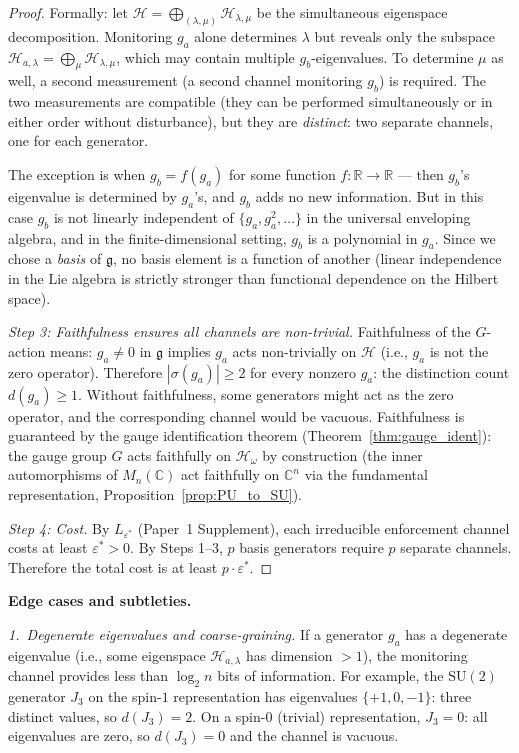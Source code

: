 \documentclass[11pt,a4paper]{article}
\theoremstyle{definition}
\newcommand{\SU}{\mathrm{SU}}
\begin{document}
\begin{proof}
Formally: let $\mathcal{H} = \bigoplus_{(\lambda, \mu)}
\mathcal{H}_{\lambda,\mu}$ be the simultaneous eigenspace
decomposition.  Monitoring $g_a$ alone determines $\lambda$ but
reveals only the subspace $\mathcal{H}_{a,\lambda} =
\bigoplus_\mu \mathcal{H}_{\lambda,\mu}$, which may contain multiple
$g_b$-eigenvalues.  To determine $\mu$ as well, a second measurement
(a second channel monitoring $g_b$) is required.  The two measurements
are compatible (they can be performed simultaneously or in either
order without disturbance), but they are \emph{distinct}: two
separate channels, one for each generator.

The exception is when $g_b = f(g_a)$ for some function
$f: \mathbb{R} \to \mathbb{R}$ --- then $g_b$'s eigenvalue is
determined by $g_a$'s, and $g_b$ adds no new information.  But in
this case $g_b$ is not linearly independent of
$\{g_a, g_a^2, \ldots\}$ in the universal enveloping algebra, and in
the finite-dimensional setting, $g_b$ is a polynomial in $g_a$.
Since we chose a \emph{basis} of $\mathfrak{g}$, no basis element is
a function of another (linear independence in the Lie algebra is
strictly stronger than functional dependence on the Hilbert space).

\textit{Step 3: Faithfulness ensures all channels are non-trivial.}\quad
Faithfulness of the $G$-action means: $g_a \ne 0$ in $\mathfrak{g}$
implies $g_a$ acts non-trivially on $\mathcal{H}$ (i.e., $g_a$ is
not the zero operator).  Therefore $|\sigma(g_a)| \ge 2$ for every
nonzero $g_a$: the distinction count $d(g_a) \ge 1$.  Without
faithfulness, some generators might act as the zero operator, and the
corresponding channel would be vacuous.  Faithfulness is guaranteed
by the gauge identification theorem
(Theorem~\ref{thm:gauge_ident}): the gauge group $G$ acts faithfully
on $\mathcal{H}_\omega$ by construction (the inner automorphisms of
$M_n(\mathbb{C})$ act faithfully on $\mathbb{C}^n$ via the
fundamental representation, Proposition~\ref{prop:PU_to_SU}).

\textit{Step 4: Cost.}\quad
By $L_{\varepsilon^*}$ (Paper~1 Supplement), each irreducible
enforcement channel costs at least $\varepsilon^* > 0$.  By Steps
1--3, $p$ basis generators require $p$ separate channels.  Therefore
the total cost is at least $p \cdot \varepsilon^*$.
\end{proof}

\smallskip\noindent\textbf{Edge cases and subtleties.}\quad

\smallskip\noindent\textit{1.\ Degenerate eigenvalues and
coarse-graining.}\quad
If a generator $g_a$ has a degenerate eigenvalue (i.e., some
eigenspace $\mathcal{H}_{a,\lambda}$ has dimension $> 1$), the
monitoring channel provides less than $\log_2 n$ bits of information.
For example, the $\SU(2)$ generator $J_3$ on the spin-$1$
representation has eigenvalues $\{+1, 0, -1\}$: three distinct
values, so $d(J_3) = 2$.  On a spin-$0$ (trivial) representation,
$J_3 = 0$: all eigenvalues are zero, so $d(J_3) = 0$ and the
channel is vacuous.
\end{document}
